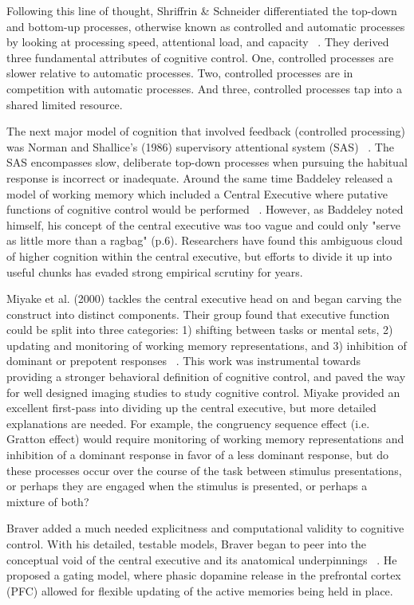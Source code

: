 \documentclass[phd,appendix,figures]{uithesis}
\begin{document}
Following this line of thought, Shriffrin \& Schneider differentiated the top-down and bottom-up processes, otherwise known as controlled and automatic processes by looking at processing speed, attentional load, and capacity ~\citep{Shiffrin1977}. 
They derived three fundamental attributes of cognitive control.
One, controlled processes are slower relative to automatic processes. 
Two, controlled processes are in competition with automatic processes. 
And three, controlled processes tap into a shared limited resource.

The next major model of cognition that involved feedback (controlled processing) was Norman and Shallice's (1986) supervisory attentional system (SAS) ~\citep{Norman1986}. 
The SAS encompasses slow, deliberate top-down processes when pursuing the habitual response is incorrect or inadequate.
Around the same time Baddeley released a model of working memory which included a Central Executive where putative functions of cognitive control would be performed ~\citep{Baddeley1996}.
However, as Baddeley noted himself, his concept of the central executive was too vague and could only "serve as little more than a ragbag" (p.6). 
Researchers have found this ambiguous cloud of higher cognition within the central executive, but efforts to divide it up into useful chunks has evaded strong empirical scrutiny for years.

Miyake et al. (2000) tackles the central executive head on and began carving the construct into distinct components. 
Their group found that executive function could be split into three categories:
1) shifting between tasks or mental sets,
2) updating and monitoring of working memory representations, and
3) inhibition of dominant or prepotent responses ~\citep{Miyake2000}.
This work was instrumental towards providing a stronger behavioral definition of cognitive control, and paved the way for well designed imaging studies to study cognitive control.
Miyake provided an excellent first-pass into dividing up the central executive, but more detailed explanations are needed.
For example, the congruency sequence effect (i.e. Gratton effect) would require monitoring of working memory representations and inhibition of a dominant response in favor of a less dominant response, but do these processes occur over the course of the task between stimulus presentations, or perhaps they are engaged when the stimulus is presented, or perhaps a mixture of both?

Braver added a much needed explicitness and computational validity to cognitive control. With his detailed, testable models, Braver began to peer into the conceptual void of the central executive and its anatomical underpinnings ~\citep{Braver2001}. 
He proposed a gating model, where phasic dopamine release in the prefrontal cortex (PFC) allowed for flexible updating of the active memories being held in place.
\end{document}
